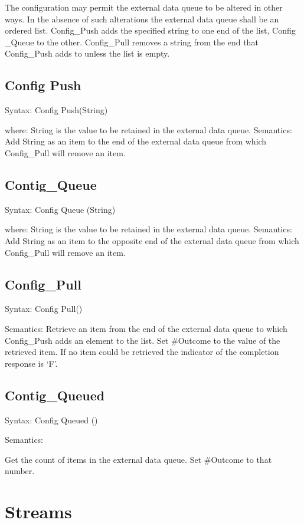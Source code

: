 The configuration may permit the external data queue to be altered in
other ways. In the absence of such alterations the external data queue
shall be an ordered list. Config\_Push adds the specified string to one
end of the list, Config \_Queue to the other. Config\_Pull removes a
string from the end that Config\_Push adds to unless the list is empty.

\subsection{Config Push}\label{config-push}

Syntax: Config Push(String)

where: String is the value to be retained in the external data queue.
Semantics: Add String as an item to the end of the external data queue
from which Config\_Pull will remove an item.

\subsection{Contig\_Queue}\label{contig_queue}

Syntax: Config Queue (String)

where: String is the value to be retained in the external data queue.
Semantics: Add String as an item to the opposite end of the external
data queue from which Config\_Pull will remove an item.

\subsection{Config\_Pull}\label{config_pull}

Syntax: Config Pull()

Semantics: Retrieve an item from the end of the external data queue to
which Config\_Push adds an element to the list. Set \#Outcome to the
value of the retrieved item. If no item could be retrieved the indicator
of the completion response is `F'.

\subsection{Contig\_Queued}\label{contig_queued}

Syntax: Config Queued ()

Semantics:

Get the count of items in the external data queue. Set \#Outcome to that
number.

\section{Streams}\label{streams}

